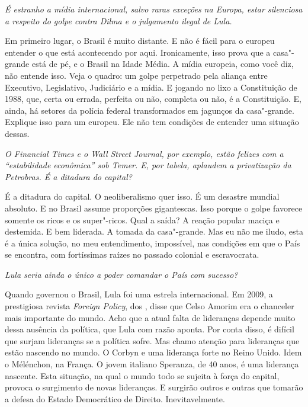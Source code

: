 \itshape
 É estranho a mídia internacional, salvo raras exceções
na Europa, estar silenciosa a respeito do golpe contra Dilma e o
julgamento ilegal de Lula.

\normalfont
Em primeiro lugar, o Brasil é muito distante. E não é
fácil para o europeu entender o que está acontecendo por aqui.
Ironicamente, isso prova que a casa"-grande está de pé, e o Brasil na
Idade Média. A mídia europeia, como você diz, não entende isso. Veja o
quadro: um golpe perpetrado pela aliança entre Executivo, Legislativo,
Judiciário e a mídia. E jogando no lixo a Constituição de 1988, que,
certa ou errada, perfeita ou não, completa ou não, é a Constituição. E,
ainda, há setores da polícia federal transformados em jagunços da
casa"-grande. Explique isso para um europeu. Ele não tem condições de
entender uma situação dessas.

\itshape
 O \emph{Financial Times} e o \emph{Wall Street
Journal}, por exemplo, estão felizes com a ``estabilidade econômica''
sob Temer. E, por tabela, aplaudem a privatização da Petrobras. É a
ditadura do capital?

\normalfont
É a ditadura do capital. O neoliberalismo quer isso. É um
desastre mundial absoluto. E no Brasil assume proporções gigantescas.
Isso porque o golpe favorece somente os ricos e os super"-ricos. Qual a
saída? A reação popular maciça e destemida. E bem liderada. A tomada da
casa"-grande. Mas eu não me iludo, esta é a única solução, no meu
entendimento, impossível, nas condições em que o País se encontra, com
fortíssimas raízes no passado colonial e escravocrata.

\itshape
 Lula seria ainda o único a poder comandar o País com
sucesso?

\normalfont
Quando governou o Brasil, Lula foi uma estrela
internacional. Em 2009, a prestigiosa revista \emph{Foreign Policy}, dos
, disse que Celso Amorim era o chanceler mais importante do mundo.
Acho que a atual falta de lideranças depende muito dessa ausência da
política, que Lula com razão aponta. Por conta disso, é difícil que
surjam lideranças se a política sofre. Mas chamo atenção para lideranças
que estão nascendo no mundo. O Corbyn e uma liderança forte no Reino
Unido. Idem o Mélénchon, na França. O jovem italiano Speranza, de 40
anos, é uma liderança nascente. Esta situação, na qual o mundo todo se
sujeita à força do capital, provoca o surgimento de novas lideranças. E
surgirão outros e outras que tomarão a defesa do Estado Democrático de
Direito. Inevitavelmente.


